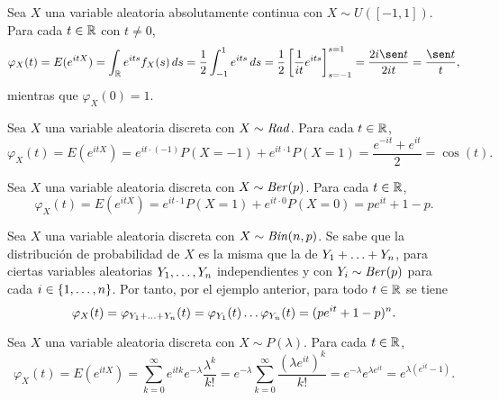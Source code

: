 \documentclass[a4paper, 11pt, extrafontsizes]{memoir}
\begin{document}
\begin{example}
    Sea $X$ una variable aleatoria absolutamente continua con $X \sim U([-1,1])$. Para cada $t \in \mathbb R$ con $t \neq 0$,
    \[\varphi_X(t) = E(e^{itX}) = \int_\R e^{its}f_X(s) \, ds = \frac{1}{2}\int_{-1}^1 e^{its} \, ds = \frac{1}{2}\left[\frac{1}{it}e^{its}\right]_{s = -1}^{s =1} = \frac{2i\sen t}{2it} = \frac{\sen t}{t},\]
    mientras que $\varphi_X(0) = 1$.
\end{example}

\begin{example}
    Sea $X$ una variable aleatoria discreta con $X \sim \textup{\emph{Rad}}$. Para cada $t \in \mathbb R$,
    \[\varphi_X(t)=E(e^{itX}) = e^{it \cdot(-1)} P(X=-1) + e^{it \cdot 1}P(X=1) = \frac{e^{-it}+e^{it}}{2} = \cos(t).\]
\end{example}

\begin{example}
    Sea $X$ una variable aleatoria discreta con $X \sim \textup{\emph{Ber}}(p)$. Para cada $t \in \mathbb R$,
    \[\varphi_X(t)= E(e^{itX}) = e^{it \cdot 1}P(X = 1) + e^{it \cdot 0}P(X = 0) = pe^{it}+1-p.\]
\end{example}

\begin{example}
    Sea $X$ una variable aleatoria discreta con $X \sim \textup{\emph{Bin}}(n,p)$. Se sabe que la distribución de probabilidad de $X$ es la misma que la de $Y_1+\mathellipsis+Y_n$, para ciertas variables aleatorias $Y_1,\mathellipsis,Y_n$ independientes y con $Y_i \sim \textup{\emph{Ber}}(p)$ para cada $i \in \{1,\mathellipsis,n\}$. Por tanto, por el ejemplo anterior, para todo $t \in \mathbb R$ se tiene
    \[\varphi_X(t)=\varphi_{Y_1+\mathellipsis+Y_n}(t) = \varphi_{Y_1}(t)\mathellipsis\varphi_{Y_n}(t) = (pe^{it}+1-p)^n.\]
\end{example}

\begin{example}\label{eje:1.9.8}
    Sea $X$ una variable aleatoria discreta con $X \sim P(\lambda)$. Para cada $t \in \mathbb R$,
    \[\varphi_X(t) = E(e^{itX}) = \sum_{k = 0}^\infty e^{itk}e^{-\lambda}\frac{\lambda^k}{k!} = e^{-\lambda}\sum_{k=0}^\infty \frac{(\lambda e^{it})^k}{k!} = e^{-\lambda}e^{\lambda e^{it}} = e^{\lambda(e^{it}-1)}.\]
\end{example}
\end{document}
